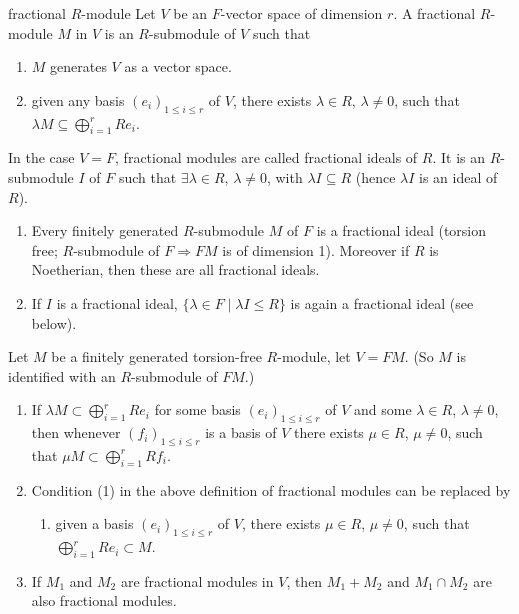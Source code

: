 \documentclass[11pt, a4paper]{report}
\begin{document}
\begin{definition}
fractional $R$-module
Let $V$ be an $F$-vector space of dimension $r$. A fractional $R$-module $M$ in $V$ is an $R$-submodule of $V$ such that
\begin{enumerate}
\item $M$ generates $V$ as a vector space.
\item given any basis $(e_{i})_{1 \leq i \leq r}$ of $V$, there exists $\lambda \in R$, $\lambda \neq 0$, such that $\lambda M \subseteq \bigoplus_{i=1}^{r} Re_{i}$.
\end{enumerate}
In the case $V = F$, fractional modules are called fractional ideals of $R$. It is an $R$-submodule $I$ of $F$ such that $\exists \lambda \in R$, $\lambda \neq 0$, with $\lambda I \subseteq R$ (hence $\lambda I$ is an ideal of $R$).

\end{definition}

\begin{example}
\begin{enumerate}
\item Every finitely generated $R$-submodule $M$ of $F$ is a fractional ideal (torsion free; $R$-submodule of $F \Rightarrow FM$ is of dimension 1). Moreover if $R$ is Noetherian, then these are all fractional ideals.
\item If $I$ is a fractional ideal, $\{\lambda \in F \mid \lambda I \leq R\}$ is again a fractional ideal (see below).
\end{enumerate}
\end{example}

\begin{lemma}
Let $M$ be a finitely generated torsion-free $R$-module, let $V = FM$. (So $M$ is identified with an $R$-submodule of $FM$.)
\begin{enumerate}
\item If $\lambda M \subset \bigoplus_{i=1}^{r} Re_{i}$ for some basis $(e_{i})_{1 \leq i \leq r}$ of $V$ and some $\lambda \in R$, $\lambda \neq 0$, then whenever $(f_{i})_{1 \leq i \leq r}$ is a basis of $V$ there exists $\mu \in R$, $\mu \neq 0$, such that $\mu M \subset \bigoplus_{i=1}^{r} Rf_{i}$.
\item Condition (1) in the above definition of fractional modules can be replaced by
\begin{enumerate}
\item[(1')] given a basis $(e_{i})_{1 \leq i \leq r}$ of $V$, there exists $\mu \in R$, $\mu \neq 0$, such that $\bigoplus_{i=1}^{r} Re_{i} \subset M$.
\end{enumerate}
\item If $M_{1}$ and $M_{2}$ are fractional modules in $V$, then $M_{1} + M_{2}$ and $M_{1} \cap M_{2}$ are also fractional modules.
\end{enumerate}
\end{lemma}
\end{document}
